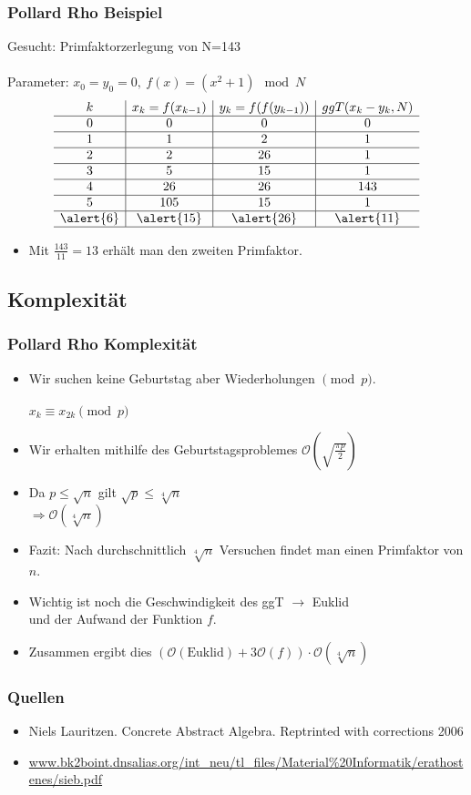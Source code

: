 \documentclass[mathserif, compress, german]{beamer}
\begin{document}
\begin{frame}
  \frametitle{Pollard Rho Beispiel}
Gesucht: Primfaktorzerlegung von N=143\\
\ \\
Parameter: $x_0 = y_0 = 0, \ f(x)=(x^2+1)\mod N$
	$$
  \begin{array}{c|c|c|c}
	k & x_k = f(x_{k-1}) & y_k = f(f(y_{k-1})) & ggT(x_k - y_k, N) \\ \hline 
        0 & 0 & 0 & 0 \\ \hline
	1 & 1 & 2 & 1 \\ \hline
	2 & 2 & 26 & 1 \\ \hline
	3 & 5 & 15 & 1 \\ \hline
	4 & 26 & 26 & 143 \\ \hline
	5 & 105 & 15 & 1 \\ \hline
	\alert{6} & \alert{15} & \alert{26} & \alert{11} \\ \hline
  \end{array}
	$$
\begin{itemize}
  \item<2-> Mit $\frac{143}{11}=13$ erh\"alt man den zweiten Primfaktor. 
\end{itemize}
\end{frame}

\subsection{Komplexit\"at}

\begin{frame}
  \frametitle{Pollard Rho Komplexit\"at}
  \begin{itemize}
    \item Wir suchen keine Geburtstag aber Wiederholungen $\pmod p$.\\
    \ \\ $x_k \equiv x_{2k} \pmod p$
    \item Wir erhalten mithilfe des Geburtstagsproblemes $\mathcal O(\sqrt{\frac{\pi p}{2}})$
    \item Da $p\leq \sqrt{n}$ gilt $\sqrt{p} \leq \sqrt[4]{n}$\\
	  $\Rightarrow \mathcal O(\sqrt[4]{n})$
    \item Fazit: Nach durchschnittlich $\sqrt[4]{n}$ Versuchen findet man einen Primfaktor von $n$.
    \item Wichtig ist noch die Geschwindigkeit des ggT $\rightarrow$ Euklid\\
          und der Aufwand der Funktion $f$.
    \item Zusammen ergibt dies $(\mathcal O(\text{Euklid})+3\mathcal O(f))\cdot\mathcal O(\sqrt[4]{n})$
  \end{itemize}
\end{frame}

\begin{frame}
\frametitle{Quellen}
  \begin{itemize}
    \item Niels Lauritzen. Concrete Abstract Algebra. Reptrinted with corrections 2006
    \item \url{www.bk2boint.dnsalias.org/int_neu/tl_files/Material\%20Informatik/erathostenes/sieb.pdf}
  \end{itemize}    
\end{frame}
\end{document}
